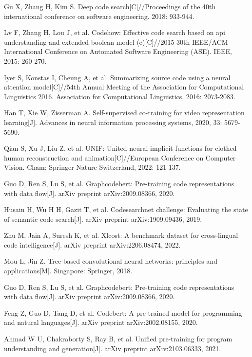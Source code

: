 \documentclass[UTF8,a4paper,12pt]{ctexart}
\numberwithin{equation}{section}
\begin{document}
\begin{thebibliography}{1}
\setlength{\itemsep}{0pt}
 Gu X, Zhang H, Kim S. Deep code search[C]//Proceedings of the 40th international conference on software engineering. 2018: 933-944.

 Lv F, Zhang H, Lou J, et al. Codehow: Effective code search based on api understanding and extended boolean model (e)[C]//2015 30th IEEE/ACM International Conference on Automated Software Engineering (ASE). IEEE, 2015: 260-270.

 Iyer S, Konstas I, Cheung A, et al. Summarizing source code using a neural attention model[C]//54th Annual Meeting of the Association for Computational Linguistics 2016. Association for Computational Linguistics, 2016: 2073-2083.

 Han T, Xie W, Zisserman A. Self-supervised co-training for video representation learning[J]. Advances in neural information processing systems, 2020, 33: 5679-5690.

 Qian S, Xu J, Liu Z, et al. UNIF: United neural implicit functions for clothed human reconstruction and animation[C]//European Conference on Computer Vision. Cham: Springer Nature Switzerland, 2022: 121-137.

 Guo D, Ren S, Lu S, et al. Graphcodebert: Pre-training code representations with data flow[J]. arXiv preprint arXiv:2009.08366, 2020.

 Husain H, Wu H H, Gazit T, et al. Codesearchnet challenge: Evaluating the state of semantic code search[J]. arXiv preprint arXiv:1909.09436, 2019.

 Zhu M, Jain A, Suresh K, et al. Xlcost: A benchmark dataset for cross-lingual code intelligence[J]. arXiv preprint arXiv:2206.08474, 2022.

 Mou L, Jin Z. Tree-based convolutional neural networks: principles and applications[M]. Singapore: Springer, 2018.

 Guo D, Ren S, Lu S, et al. Graphcodebert: Pre-training code representations with data flow[J]. arXiv preprint arXiv:2009.08366, 2020.

 Feng Z, Guo D, Tang D, et al. Codebert: A pre-trained model for programming and natural languages[J]. arXiv preprint arXiv:2002.08155, 2020.

 Ahmad W U, Chakraborty S, Ray B, et al. Unified pre-training for program understanding and generation[J]. arXiv preprint arXiv:2103.06333, 2021.


\end{thebibliography}
\end{document}
